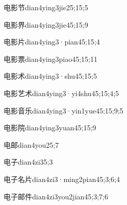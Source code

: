 \begin{verbete}{电影节}{dian4ying3jie2}{5;15;5}
\end{verbete}

\begin{verbete}{电影界}{dian4ying3jie4}{5;15;9}
\end{verbete}

\begin{verbete}{电影片}{dian4ying3·pian4}{5;15;4}
\end{verbete}

\begin{verbete}{电影票}{dian4ying3piao4}{5;15;11}
\end{verbete}

\begin{verbete}{电影术}{dian4ying3·shu4}{5;15;5}
\end{verbete}

\begin{verbete}{电影艺术}{dian4ying3·yi4shu4}{5;15;4;5}
\end{verbete}

\begin{verbete}{电影音乐}{dian4ying3·yin1yue4}{5;15;9;5}
\end{verbete}

\begin{verbete}{电影院}{dian4ying3yuan4}{5;15;9}
\end{verbete}

\begin{verbete}{电邮}{dian4you2}{5;7}
\end{verbete}

\begin{verbete}{电子}{dian4zi3}{5;3}
\end{verbete}

\begin{verbete}{电子名片}{dian4zi3·ming2pian4}{5;3;6;4}
\end{verbete}

\begin{verbete}{电子邮件}{dian4zi3you2jian4}{5;3;7;6}
\end{verbete}

